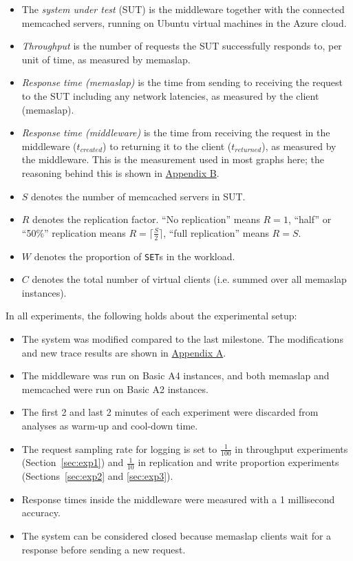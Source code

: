 \documentclass[11pt]{article}
\newcommand{\set}[0]{\texttt{SET}}
\begin{document}
\begin{itemize}
\item The \emph{system under test} (SUT) is the middleware together with the connected memcached servers, running on Ubuntu virtual machines in the Azure cloud.
\item \emph{Throughput} is the number of requests the SUT successfully responds to, per unit of time, as measured by memaslap.
\item \emph{Response time (memaslap)} is the time from sending to receiving the request to the SUT including any network latencies, as measured by the client (memaslap).
\item \emph{Response time (middleware)} is the time from receiving the request in the middleware ($t_{created}$) to returning it to the client ($t_{returned}$), as measured by the middleware. This is the measurement used in most graphs here; the reasoning behind this is shown in \hyperref[sec:appb]{Appendix B}.
\item $S$ denotes the number of memcached servers in SUT.
\item $R$ denotes the replication factor. ``No replication'' means $R=1$, ``half'' or ``50\%'' replication means $R=\lceil\frac{S}{2}\rceil$, ``full replication'' means $R=S$.
\item $W$ denotes the proportion of \set{}s in the workload.
\item $C$ denotes the total number of virtual clients (i.e. summed over all memaslap instances).
\end{itemize}
\vspace{1mm}
In all experiments, the following holds about the experimental setup:
\begin{itemize}
\item The system was modified compared to the last milestone. The modifications and new trace results are shown in \hyperref[sec:appa]{Appendix A}.
\item The middleware was run on Basic A4 instances, and both memaslap and memcached were run on Basic A2 instances.
\item The first 2 and last 2 minutes of each experiment were discarded from analyses as warm-up and cool-down time.
\item The request sampling rate for logging is set to $\frac{1}{100}$ in throughput experiments (Section~\ref{sec:exp1}) and $\frac{1}{10}$ in replication and write proportion experiments (Sections~\ref{sec:exp2} and \ref{sec:exp3}).
\item Response times inside the middleware were measured with a 1 millisecond accuracy.
\item The system can be considered closed because memaslap clients wait for a response before sending a new request.
\end{itemize}
\end{document}
